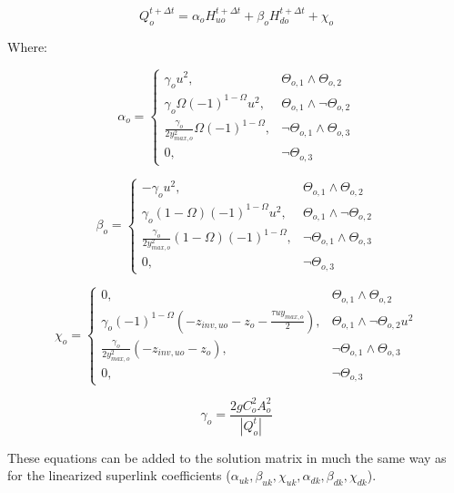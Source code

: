 \documentclass[11pt]{article}
\begin{document}
\begin{equation}
 Q_{o}^{t + \Delta t} = \alpha_{o} H_{uo}^{t + \Delta t} + \beta_{o} H_{do}^{t + \Delta t} + \chi_{o} 
\end{equation}

Where:


\begin{equation}
  \alpha_{o} =
  \begin{cases}
   \gamma_o u^2, & \Theta_{o,1} \land \Theta_{o,2}\\
   \gamma_o \Omega (-1)^{1 - \Omega} u^2, & \Theta_{o,1} \land \lnot \Theta_{o,2}\\
   \frac{\gamma_o}{2 y_{max,o}^2} \Omega (-1)^{1 - \Omega}, & \lnot \Theta_{o,1} \land \Theta_{o,3} \\
   0, & \lnot \Theta_{o,3}
  \end{cases}
\end{equation}

\begin{equation}
  \beta_{o} =
  \begin{cases}
   -\gamma_o u^2, & \Theta_{o,1} \land \Theta_{o,2}\\
   \gamma_o (1 - \Omega) (-1)^{1 - \Omega} u^2, & \Theta_{o,1} \land \lnot \Theta_{o,2}\\
   \frac{\gamma_o}{2 y_{max,o}^2} (1 - \Omega) (-1)^{1 - \Omega}, & \lnot \Theta_{o,1} \land \Theta_{o,3} \\
   0, & \lnot \Theta_{o,3}
  \end{cases}
\end{equation}

\begin{equation}
  \chi_{o} =
  \begin{cases}
   0, & \Theta_{o,1} \land \Theta_{o,2}\\
   \gamma_o (-1)^{1 - \Omega} (- z_{inv,uo} - z_o - \frac{\tau u y_{max,o}}{2}), & \Theta_{o,1} \land \lnot \Theta_{o,2} u^2\\
   \frac{\gamma_o}{2 y_{max,o}^2} (- z_{inv,uo} - z_o), & \lnot \Theta_{o,1} \land \Theta_{o,3} \\
   0, & \lnot \Theta_{o,3}
  \end{cases}
\end{equation}

\begin{equation}
 \gamma_o = \frac{2 g C_o^2 A_o^2}{|Q_o^t|} 
\end{equation}

These equations can be added to the solution matrix in much the same way as for the
linearized superlink coefficients ($\alpha_{uk}, \beta_{uk}, \chi_{uk},
\alpha_{dk}, \beta_{dk}, \chi_{dk}$).
\end{document}
